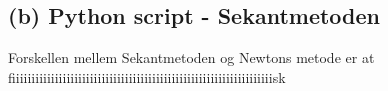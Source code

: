 \subsection*{(b) Python script - Sekantmetoden}

Forskellen mellem Sekantmetoden og Newtons metode er at fiiiiiiiiiiiiiiiiiiiiiiiiiiiiiiiiiiiiiiiiiiiiiiiiiiiiiiiiiiiiiiiiiiisk 

